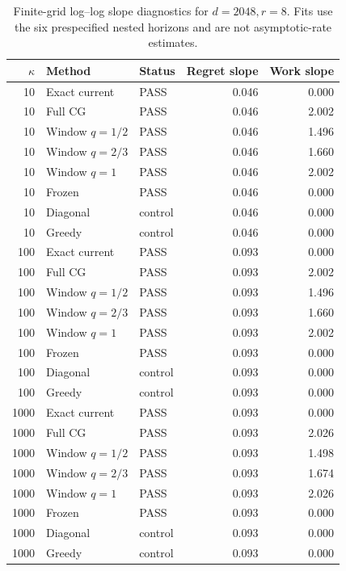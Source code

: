 \begin{table}[p]
\centering\scriptsize
\begin{tabular}{rllrr}
\toprule
$\kappa$ & Method & Status & Regret slope & Work slope \\
\midrule
10 & Exact current & PASS & 0.046 & 0.000 \\
10 & Full CG & PASS & 0.046 & 2.002 \\
10 & Window $q=1/2$ & PASS & 0.046 & 1.496 \\
10 & Window $q=2/3$ & PASS & 0.046 & 1.660 \\
10 & Window $q=1$ & PASS & 0.046 & 2.002 \\
10 & Frozen & PASS & 0.046 & 0.000 \\
10 & Diagonal & control & 0.046 & 0.000 \\
10 & Greedy & control & 0.046 & 0.000 \\
100 & Exact current & PASS & 0.093 & 0.000 \\
100 & Full CG & PASS & 0.093 & 2.002 \\
100 & Window $q=1/2$ & PASS & 0.093 & 1.496 \\
100 & Window $q=2/3$ & PASS & 0.093 & 1.660 \\
100 & Window $q=1$ & PASS & 0.093 & 2.002 \\
100 & Frozen & PASS & 0.093 & 0.000 \\
100 & Diagonal & control & 0.093 & 0.000 \\
100 & Greedy & control & 0.093 & 0.000 \\
1000 & Exact current & PASS & 0.093 & 0.000 \\
1000 & Full CG & PASS & 0.093 & 2.026 \\
1000 & Window $q=1/2$ & PASS & 0.093 & 1.498 \\
1000 & Window $q=2/3$ & PASS & 0.093 & 1.674 \\
1000 & Window $q=1$ & PASS & 0.093 & 2.026 \\
1000 & Frozen & PASS & 0.093 & 0.000 \\
1000 & Diagonal & control & 0.093 & 0.000 \\
1000 & Greedy & control & 0.093 & 0.000 \\
\bottomrule
\end{tabular}
\caption{Finite-grid log--log slope diagnostics for $d=2048,r=8$.  Fits use the six prespecified nested horizons and are not asymptotic-rate estimates.}
\label{tab:certified-scaling-fits-8}
\end{table}

